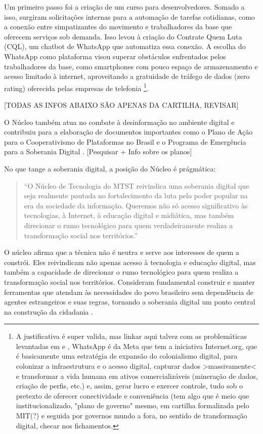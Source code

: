 Um primeiro passo foi a criação de um curso para desenvolvedores. Somado a isso, surgiram solicitações internas para a automação de tarefas cotidianas, como a conexão entre simpatizantes do movimento e trabalhadores da base que oferecem serviços sob demanda. Isso levou à criação do Contrate Quem Luta (CQL), um chatbot de WhatsApp que automatiza essa conexão. A escolha do WhatsApp como plataforma visou superar obstáculos enfrentados pelos trabalhadores da base, como smartphones com pouco espaço de armazenamento e acesso limitado à internet, aproveitando a gratuidade de tráfego de dados (zero rating) oferecida pelas empresas de telefonia \footnote{A justificativa é super valida, mas linkar aqui talvez com as problemáticas levantadas em \cite{Silveira2021} e \cite{Faustino2023}, WhatsApp é da Meta que tem a iniciativa Internet.org, que é basicamente uma estratégia de expansão do colonialismo digital, para colonizar a infraestrutura e o acesso digital, capturar dados >massivamente< e transformar a vida humana em ativos comercializáveis (mineração de dados, criação de perfis, etc.) e, assim, gerar lucro e exercer controle, tudo sob o pretexto de oferecer conectividade e conveniência (tem algo que é meio que institucionalizado, "plano de governo" mesmo, em cartilha formalizada pelo MIT(?) e seguida por governos mundo a fora, no sentido de transformação digital, checar nos fichamentos.}.


[TODAS AS INFOS ABAIXO SÃO APENAS DA CARTILHA, REVISAR]

O Núcleo também atua no combate à desinformação no ambiente digital e contribuiu para a elaboração de documentos importantes como o Plano de Ação para o Cooperativismo de Plataformas no Brasil e o Programa de Emergência para a Soberania Digital \cite{mtst2023cartilha}. [Pesquisar + Info sobre os planos]

No que tange a soberania digital, a posição do Núcleo é prágmática:
\begin{quote}
“O Núcleo de Tecnologia do MTST reivindica uma soberania digital que seja realmente pautada no fortalecimento da luta pelo poder popular na era da sociedade da informação. Queremos não só acesso significativo às tecnologias, à Internet, à educação digital e midiática, mas também direcionar o rumo tecnológico para quem verdadeiramente realiza a transformação social nos territórios.” \cite[p.~5]{mtst2023cartilha}
\end{quote}
O núcleo afirma que a técnica não é neutra e serve aos interesses de quem a constrói.
Eles reivindicam não apenas acesso à tecnologia e educação digital, mas também a capacidade de direcionar o rumo tecnológico para quem realiza a transformação social nos territórios. Consideram fundamental construir e manter ferramentas que atendam às necessidades do povo brasileiro sem dependência de agentes estrangeiros e suas regras, tornando a soberania digital um ponto central na construção da cidadania \cite{mtst2023cartilha}.

